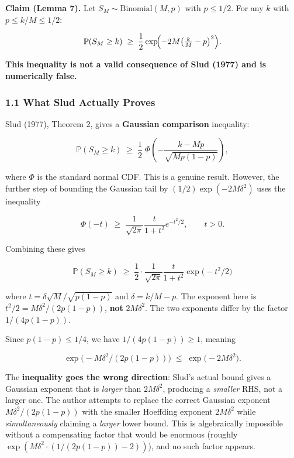 \documentclass[
  12pt,
]{article}
\begin{document}
\textbf{Claim (Lemma 7).} Let \(S_M \sim \text{Binomial}(M,p)\) with
\(p \leq 1/2\). For any \(k\) with \(p \leq k/M \leq 1/2\):

\[\mathbb{P}(S_M \geq k) \;\geq\; \frac12 \exp\!\Bigl(-2M\bigl(\tfrac{k}{M} - p\bigr)^2\Bigr).\]

\textbf{This inequality is not a valid consequence of Slud (1977) and is
numerically false.}

\subsubsection{1.1 What Slud Actually
Proves}\label{what-slud-actually-proves}

Slud (1977), Theorem 2, gives a \textbf{Gaussian comparison} inequality:

\[\mathbb{P}(S_M \geq k) \;\geq\; \frac12 \;\Phi\!\left(-\frac{k-Mp}{\sqrt{Mp(1-p)}}\right),\]

where \(\Phi\) is the standard normal CDF. This is a genuine result.
However, the further step of bounding the Gaussian tail by
\((1/2)\exp(-2M\delta^2)\) uses the inequality

\[\Phi(-t) \;\geq\; \frac{1}{\sqrt{2\pi}}\frac{t}{1+t^2}e^{-t^2/2}, \qquad t > 0.\]

Combining these gives

\[\mathbb{P}(S_M \geq k) \;\geq\; \frac12 \cdot \frac{1}{\sqrt{2\pi}}\frac{t}{1+t^2}\exp\!\bigl(-t^2/2\bigr)\]

where \(t = \delta\sqrt{M}/\sqrt{p(1-p)}\) and \(\delta = k/M - p\). The
exponent here is \(t^2/2 = M\delta^2/(2p(1-p))\), \textbf{not}
\(2M\delta^2\). The two exponents differ by the factor \(1/(4p(1-p))\).

Since \(p(1-p) \leq 1/4\), we have \(1/(4p(1-p)) \geq 1\), meaning

\[\exp\!\bigl(-M\delta^2/(2p(1-p))\bigr) \;\leq\; \exp\!\bigl(-2M\delta^2\bigr).\]

The \textbf{inequality goes the wrong direction}: Slud's actual bound
gives a Gaussian exponent that is \emph{larger} than \(2M\delta^2\),
producing a \emph{smaller} RHS, not a larger one. The author attempts to
replace the correct Gaussian exponent \(M\delta^2/(2p(1-p))\) with the
smaller Hoeffding exponent \(2M\delta^2\) while \emph{simultaneously}
claiming a \emph{larger} lower bound. This is algebraically impossible
without a compensating factor that would be enormous (roughly
\(\exp(M\delta^2\cdot(1/(2p(1-p))-2))\)), and no such factor appears.
\end{document}
